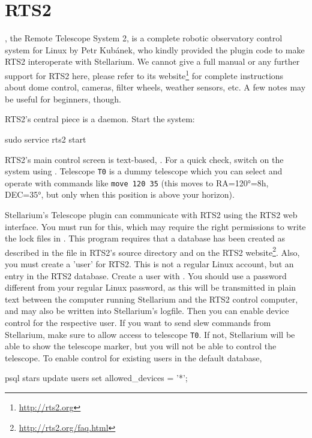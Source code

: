 \section{RTS2}
\label{sec:plugins:TelescopeControl:RTS2}

, the Remote Telescope System 2, is a complete robotic observatory control system for Linux 
by Petr Kub\'{a}nek, who kindly provided the plugin code to make RTS2 interoperate with Stellarium.
We cannot give a full manual or any further support for RTS2 here, please refer to its website\footnote{\url{http://rts2.org}} 
for complete instructions about dome control, cameras, filter wheels, weather sensors, etc. 
A few notes may be useful for beginners, though. 

RTS2's central piece is a daemon. Start the system:
\begin{commands}
sudo service rts2 start
\end{commands}
RTS2's main control screen is text-based, . For a quick check, switch on the system using . 
Telescope \texttt{T0} is a dummy telescope which you can select and operate with commands like \texttt{move 120 35} 
(this moves to RA=120°=8h, DEC=35°, but only when this position is above your horizon).

Stellarium's Telescope plugin can communicate with RTS2 using the RTS2 web interface. You must run  for this, 
which may require the right permissions to write the lock files in . This program requires 
that a database has been created as described in the file  in RTS2's source directory and on the RTS2 website\footnote{\url{http://rts2.org/faq.html}}.   
Also, you must create a 'user' for RTS2. This is not a regular Linux account, but an entry in the RTS2 database. 
Create a user with . You should use a password different from your regular Linux password, 
as this will be transmitted in plain text between the computer running Stellarium and the RTS2 control computer, 
and may also be written into Stellarium's logfile. Then you can enable device control for the respective user. 
If you want to send slew commands from Stellarium, make sure to allow access to telescope \texttt{T0}. 
If not, Stellarium will be able to show the telescope marker, but you will not be able to control the telescope. 
To enable control for existing users in the default  database, 
\begin{commands}
psql stars
update users set allowed_devices = '*';
\end{commands}

